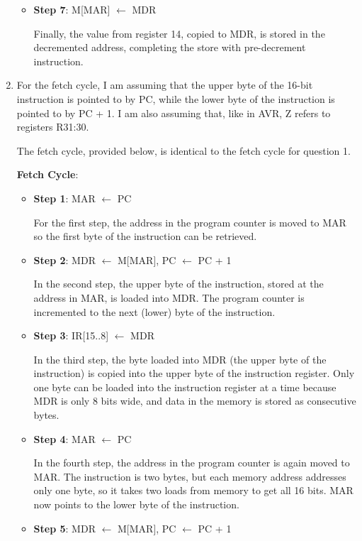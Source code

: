 \documentclass[11pt]{article}
\begin{document}
\begin{enumerate}[leftmargin=0.2in]
\begin{itemize}
  \item \textbf{Step 7}: M[MAR] $\leftarrow$ MDR

    Finally, the value from register 14, copied to MDR, is stored in the decremented address, completing the store with pre-decrement instruction.
\end{itemize}

\item For the fetch cycle, I am assuming that the upper byte of the 16-bit instruction is pointed to by PC, while the lower byte of the instruction is pointed to by PC + 1. I am also assuming that, like in AVR, Z refers to registers R31:30.

  The fetch cycle, provided below, is identical to the fetch cycle for question 1.

\textbf{Fetch Cycle}:
\begin{itemize}
  \item \textbf{Step 1}: MAR $\leftarrow$ PC

    For the first step, the address in the program counter is moved to MAR so the first byte of the instruction can be retrieved.

  \item \textbf{Step 2}: MDR $\leftarrow$ M[MAR], PC $\leftarrow$ PC + 1

    In the second step, the upper byte of the instruction, stored at the address in MAR, is loaded into MDR. The program counter is incremented to the next (lower) byte of the instruction.

  \item \textbf{Step 3}: IR[15..8] $\leftarrow$ MDR

    In the third step, the byte loaded into MDR (the upper byte of the instruction) is copied into the upper byte of the instruction register. Only one byte can be loaded into the instruction register at a time because MDR is only 8 bits wide, and data in the memory is stored as consecutive bytes.

  \item \textbf{Step 4}: MAR $\leftarrow$ PC
    
    In the fourth step, the address in the program counter is again moved to MAR. The instruction is two bytes, but each memory address addresses only one byte, so it takes two loads from memory to get all 16 bits. MAR now points to the lower byte of the instruction.

  \item \textbf{Step 5}: MDR $\leftarrow$ M[MAR], PC $\leftarrow$ PC + 1


\end{itemize}
\end{enumerate}
\end{document}
